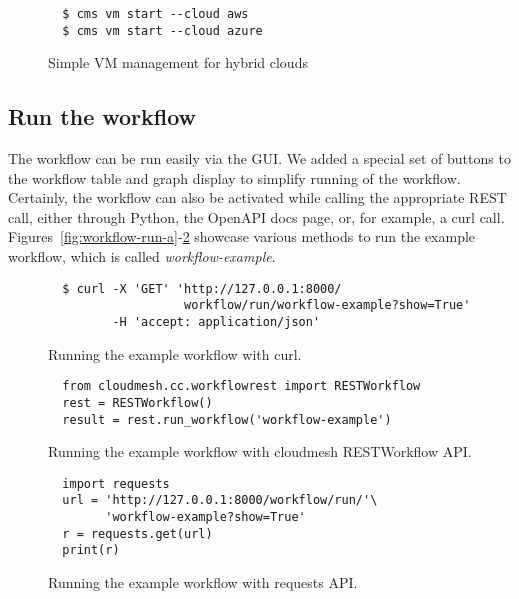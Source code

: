 
\begin{figure}[htb]

{\scriptsize\begin{verbatim}
  $ cms vm start --cloud aws
  $ cms vm start --cloud azure
\end{verbatim}}

\caption{Simple VM management for hybrid clouds}
\label{fig:cms}
\end{figure}  


\subsection{Run the workflow}\label{run-the-workflow}

The workflow can be run easily via the GUI. We added a special set of
buttons to the workflow table and graph display to simplify running of
the workflow. Certainly, the workflow can also be activated while
calling the appropriate REST call, either through Python, the OpenAPI
docs page, or, for example, a curl call.
Figures~\ref{fig:workflow-run-a}-\ref{fig:workflow-run-c}
showcase various methods to run the example workflow, which is called
{\em workflow-example}.


\begin{figure}[htb]

{\scriptsize\begin{verbatim}
  $ curl -X 'GET' 'http://127.0.0.1:8000/
                   workflow/run/workflow-example?show=True'
         -H 'accept: application/json'
\end{verbatim}}%

\caption{Running the example workflow with curl.}
\label{fig:workflow-run-a}
\bigskip

{\scriptsize\begin{verbatim}
  from cloudmesh.cc.workflowrest import RESTWorkflow
  rest = RESTWorkflow()
  result = rest.run_workflow('workflow-example')
\end{verbatim}}

\caption{Running the example workflow with cloudmesh RESTWorkflow API.}
\label{fig:workflow-run-b}
\bigskip

{\scriptsize\begin{verbatim}
  import requests
  url = 'http://127.0.0.1:8000/workflow/run/'\
        'workflow-example?show=True'
  r = requests.get(url)
  print(r)
\end{verbatim}}

\caption{Running the example workflow with requests API.}
\label{fig:workflow-run-c}

\end{figure}